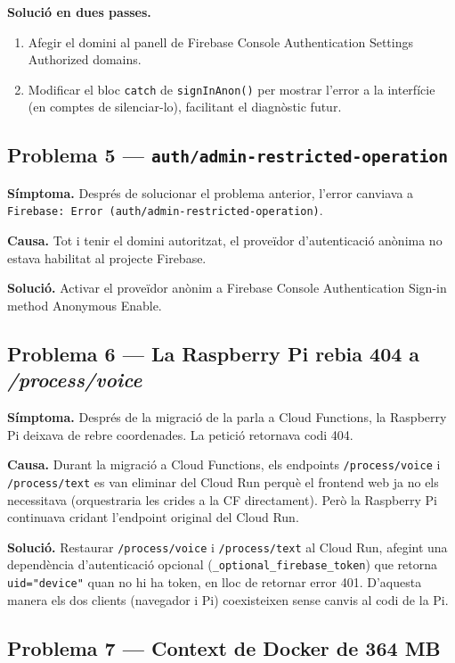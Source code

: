 \textbf{Solució en dues passes.}
\begin{enumerate}
  \item Afegir el domini al panell de Firebase Console \arw{} Authentication \arw{} Settings \arw{} Authorized domains.
  \item Modificar el bloc \texttt{catch} de \texttt{signInAnon()} per mostrar l'error a la interfície (en comptes de silenciar-lo), facilitant el diagnòstic futur.
\end{enumerate}

\subsection*{Problema 5 — \texttt{auth/admin-restricted-operation}}

\textbf{Símptoma.} Després de solucionar el problema anterior, l'error canviava a \texttt{Firebase: Error (auth/admin-restricted-operation)}.

\textbf{Causa.} Tot i tenir el domini autoritzat, el proveïdor d'autenticació anònima no estava habilitat al projecte Firebase.

\textbf{Solució.} Activar el proveïdor anònim a Firebase Console \arw{} Authentication \arw{} Sign-in method \arw{} Anonymous \arw{} Enable.

\subsection*{Problema 6 — La Raspberry Pi rebia 404 a \textit{/process/voice}}

\textbf{Símptoma.} Després de la migració de la parla a Cloud Functions, la Raspberry Pi deixava de rebre coordenades. La petició retornava codi 404.

\textbf{Causa.} Durant la migració a Cloud Functions, els endpoints \texttt{/process/voice} i \texttt{/process/text} es van eliminar del Cloud Run perquè el frontend web ja no els necessitava (orquestraria les crides a la CF directament). Però la Raspberry Pi continuava cridant l'endpoint original del Cloud Run.

\textbf{Solució.} Restaurar \texttt{/process/voice} i \texttt{/process/text} al Cloud Run, afegint una dependència d'autenticació opcional (\texttt{\_optional\_firebase\_token}) que retorna \texttt{uid="device"} quan no hi ha token, en lloc de retornar error 401. D'aquesta manera els dos clients (navegador i Pi) coexisteixen sense canvis al codi de la Pi.

\subsection*{Problema 7 — Context de Docker de 364 MB}

